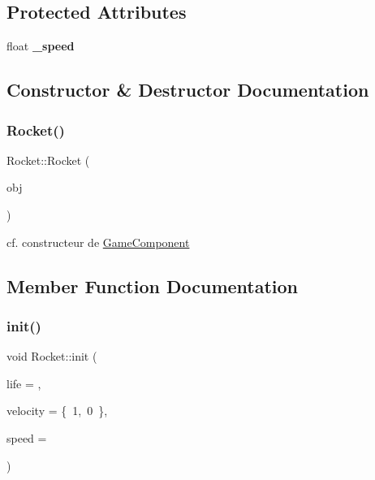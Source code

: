 \subsection*{Protected Attributes}
\begin{DoxyCompactItemize}
\item 
\hypertarget{class_rocket_aa0c252aa8094bc942d743aed643fcf08}{}\label{class_rocket_aa0c252aa8094bc942d743aed643fcf08} 
float {\bfseries \+\_\+speed}
\end{DoxyCompactItemize}


\subsection{Constructor \& Destructor Documentation}
\hypertarget{class_rocket_aa1ab185c1ec59b4983114b41efd59ea0}{}\label{class_rocket_aa1ab185c1ec59b4983114b41efd59ea0} 
\subsubsection{\texorpdfstring{Rocket()}{Rocket()}}
{\footnotesize\ttfamily Rocket\+::\+Rocket (\begin{DoxyParamCaption}\item[{\hyperlink{class_game_object}{Game\+Object} $\ast$}]{obj }\end{DoxyParamCaption})}

cf. constructeur de \hyperlink{class_game_component}{Game\+Component} 

\subsection{Member Function Documentation}
\hypertarget{class_rocket_ace1889a9c70f40bafb955dbc48ecc9d0}{}\label{class_rocket_ace1889a9c70f40bafb955dbc48ecc9d0} 
\subsubsection{\texorpdfstring{init()}{init()}}
{\footnotesize\ttfamily void Rocket\+::init (\begin{DoxyParamCaption}\item[{int}]{life = {},  }\item[{\hyperlink{structvector2}{vector2}}]{velocity = {\ttfamily \{~1,~0~\}},  }\item[{float}]{speed = {} }\end{DoxyParamCaption})}



